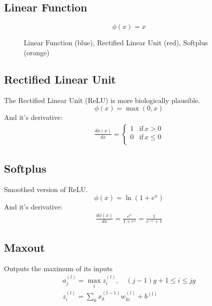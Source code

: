 \subsection{Linear Function}
\begin{equation}
\phi(x) = x
\end{equation}

\begin{figure}
\centering
{}
\caption{Linear Function (blue), Rectified Linear Unit (red), Softplus (orange)}
\end{figure}

\subsection{Rectified Linear Unit}
The Rectified Linear Unit (ReLU) is more biologically plausible.
\begin{equation}
\phi(x) = \max(0, x)
\end{equation}
And it's derivative:
\begin{align*}
\frac{d\phi(x)}{dx} = 
	\begin{cases}
		1 & \text{if}\, x > 0\\
		0 & \text{if}\, x \leq 0\\
	\end{cases}
\end{align*}

\subsection{Softplus}
Smoothed version of ReLU.
\begin{equation}\label{eq:softplus}
\phi(x) = \ln(1 + e^x)
\end{equation}
And it's derivative:
\begin{align*}
\frac{d\phi(x)}{dx} = \frac{e^x}{1 + e^x} = \frac{1}{e^{-x} + 1}
\end{align*}

\subsection{Maxout}
Outputs the maximum of its inputs
\begin{align}
a_j^{(l)} = \max_i z_i^{(l)}, \quad (j-1)g +1 \leq i \leq j g \\
z_i^{(l)} = \sum_k x_k^{(l-1)} w_{ki}^{(l)} + b^{(l)}
\end{align}